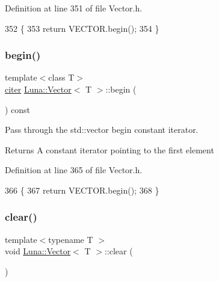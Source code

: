 Definition at line 351 of file Vector.\+h.


\begin{DoxyCode}
352     \{
353       \textcolor{keywordflow}{return} VECTOR.begin();
354     \}
\end{DoxyCode}
\mbox{\label{classLuna_1_1Vector_ad4ac7dad7a59a052ca549319f1b1d5a6}} 
\subsubsection{\texorpdfstring{begin()}{begin()}\hspace{0.1cm}{\footnotesize\ttfamily [2/2]}}
{\footnotesize\ttfamily template$<$class T$>$ \\
\hyperlink{classLuna_1_1Vector_a90cff5eab2782bc1c6aaa879ce18a2b8}{citer} \hyperlink{classLuna_1_1Vector}{Luna\+::\+Vector}$<$ T $>$\+::begin (\begin{DoxyParamCaption}{ }\end{DoxyParamCaption}) const\hspace{0.3cm}{\ttfamily [inline]}}



Pass through the std\+::vector begin constant iterator. 

\begin{DoxyReturn}{Returns}
A constant iterator pointing to the first element 
\end{DoxyReturn}


Definition at line 365 of file Vector.\+h.


\begin{DoxyCode}
366     \{
367       \textcolor{keywordflow}{return} VECTOR.begin();
368     \}
\end{DoxyCode}
\mbox{\label{classLuna_1_1Vector_a7d2f6fca261feba2660cfb2b4819e5e1}} 
\subsubsection{\texorpdfstring{clear()}{clear()}}
{\footnotesize\ttfamily template$<$typename T $>$ \\
void \hyperlink{classLuna_1_1Vector}{Luna\+::\+Vector}$<$ T $>$\+::clear (\begin{DoxyParamCaption}{ }\end{DoxyParamCaption})\hspace{0.3cm}{\ttfamily [inline]}}




